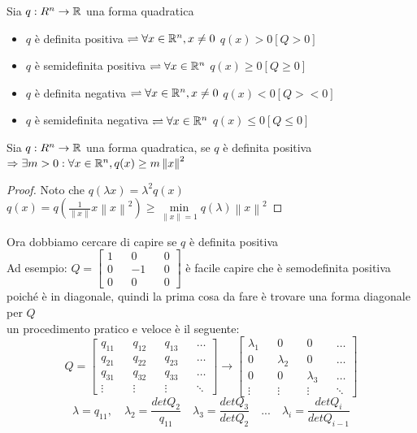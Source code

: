 Sia $q:R^n\rightarrow \mathbb{R}$ una forma quadratica\\
\begin{itemize}
	\item $q$ è definita positiva $\rightleftharpoons \forall x\in \mathbb{R}^n, x\ne 0$ $q(x)>0 [Q>0]$
	\item $q$ è semidefinita positiva $\rightleftharpoons \forall x\in \mathbb{R}^n$ $q(x)\ge0 [Q\ge0]$
	\item $q$ è definita negativa $\rightleftharpoons \forall x\in \mathbb{R}^n, x\ne 0$ $q(x)<0 [Q><0]$
	\item $q$ è semidefinita negativa $\rightleftharpoons \forall x\in \mathbb{R}^n$ $q(x)\le0 [Q\le0]$
\end{itemize}
\proposition
Sia $q:R^n\rightarrow \mathbb{R}$ una forma quadratica, se $q$ è definita positiva $\Rightarrow \exists m>0: \forall x \in \mathbb{R}^n, q(x)\ge m\left\|x\right\|^2$
\begin{proof}
	Noto che $q(\lambda x)=\lambda^2q(x)$\\
	$q(x)=q\left(\frac{1}{\left\|x\right\|}x\left\|x\right\|^2\right)\ge\min\limits_{\left\|x\right\|=1}q(\lambda)\left\|x\right\|^2$
\end{proof}
Ora dobbiamo cercare di capire se $q$ è definita positiva\\
Ad esempio: $Q=\begin{bmatrix}1&&0&&0\\0&&-1&&0\\0&&0&&0\end{bmatrix}$ è facile capire che è semodefinita positiva poiché è in diagonale, quindi la prima cosa da fare è trovare una forma diagonale per $Q$\\
un procedimento pratico e veloce è il seguente:\\
$$Q=\begin{bmatrix}q_{11}&&q_{12}&&q_{13}&&\ldots\\q_{21}&&q_{22}&&q_{23}&&\ldots\\q_{31}&&q_{32}&&q_{33}&&\ldots\\\vdots&&\vdots&&\vdots&&\ddots\end{bmatrix}\rightarrow\begin{bmatrix}\lambda_{1}&&0&&0&&\ldots\\0&&\lambda_{2}&&0&&\ldots\\0&&0&&\lambda_{3}&&\ldots\\\vdots&&\vdots&&\vdots&&\ddots\end{bmatrix}$$
$$\lambda=q_{11},\quad\lambda_{2}=\frac{detQ_2}{q_11}\quad\lambda_{3}=\frac{detQ_3}{detQ_2}\quad ...\quad \lambda_{i}=\frac{detQ_i}{detQ_{i-1}}$$
